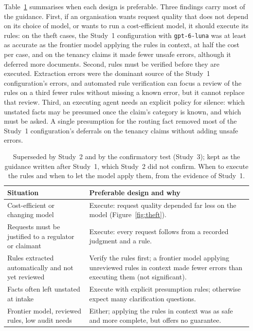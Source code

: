 Table~\ref{tab:guidance} summarises when each design is preferable. Three findings carry most of the guidance. First, if an organisation wants request quality that does not depend on its choice of model, or wants to run a cost-efficient model, it should execute its rules: on the theft cases, the Study~1 configuration with \texttt{gpt-6-luna} was at least as accurate as the frontier model applying the rules in context, at half the cost per case, and on the tenancy claims it made fewer unsafe errors, although it deferred more documents. Second, rules must be verified before they are executed. Extraction errors were the dominant source of the Study~1 configuration's errors, and automated rule verification can focus a review of the rules on a third fewer rules without missing a known error, but it cannot replace that review. Third, an executing agent needs an explicit policy for silence: which unstated facts may be presumed once the claim's category is known, and which must be asked. A single presumption for the routing fact removed most of the Study~1 configuration's deferrals on the tenancy claims without adding unsafe errors.

\begin{table}[t]
\caption{Superseded by Study~2 and by the confirmatory test (Study~3); kept as the guidance written after Study~1, which Study~2 did not confirm. When to execute the rules and when to let the model apply them, from the evidence of Study~1.}
\label{tab:guidance}
\small
\begin{tabularx}{\linewidth}{@{}XX@{}}
\toprule
Situation & Preferable design and why \\
\midrule
Cost-efficient or changing model & Execute: request quality depended far less on the model (Figure~\ref{fig:theft}). \\
Requests must be justified to a regulator or claimant & Execute: every request follows from a recorded judgment and a rule. \\
Rules extracted automatically and not yet reviewed & Verify the rules first; a frontier model applying unreviewed rules in context made fewer errors than executing them (not significant). \\
Facts often left unstated at intake & Execute with explicit presumption rules; otherwise expect many clarification questions. \\
Frontier model, reviewed rules, low audit needs & Either; applying the rules in context was as safe and more complete, but offers no guarantee. \\
\bottomrule
\end{tabularx}
\end{table}

